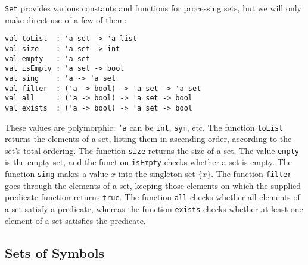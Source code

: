 \texttt{Set} provides various constants and functions for
processing sets, but we will only make direct use of a few of them:
\begin{verbatim}
val toList  : 'a set -> 'a list
val size    : 'a set -> int
val empty   : 'a set
val isEmpty : 'a set -> bool
val sing    : 'a -> 'a set
val filter  : ('a -> bool) -> 'a set -> 'a set
val all     : ('a -> bool) -> 'a set -> bool
val exists  : ('a -> bool) -> 'a set -> bool
\end{verbatim}
%
%
%
%
%
%
%
%
These values are polymorphic: \texttt{'a} can be \texttt{int},
\texttt{sym}, etc.
The function \texttt{toList} returns the elements of a set, listing
them in ascending order, according to the set's total ordering.
The function \texttt{size} returns the size of a set.
The value \texttt{empty} is the empty set, and the function
\texttt{isEmpty} checks whether a set is empty.
The function \texttt{sing} makes a value $x$ into the singleton
set $\{x\}$. The function \texttt{filter} goes through the elements of
a set, keeping those elements on which the supplied predicate function
returns \texttt{true}. The function \texttt{all} checks whether all
elements of a set satisfy a predicate, whereas the function
\texttt{exists} checks whether at least one element of a set satisfies
the predicate.

\subsection{Sets of Symbols}

